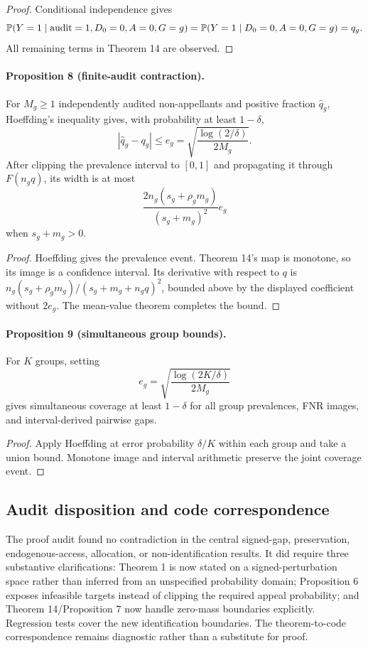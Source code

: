 \begin{proof}
Conditional independence gives
\[
\mathbb{P}(Y=1\mid \text{audit}=1,D_0=0,A=0,G=g)
=\mathbb{P}(Y=1\mid D_0=0,A=0,G=g)=q_g.
\]
All remaining terms in Theorem 14 are observed.
\end{proof}

\paragraph{Proposition 8 (finite-audit contraction).}
For $M_g\ge1$ independently audited non-appellants and positive fraction
$\widehat q_g$, Hoeffding's inequality gives, with probability at least
$1-\delta$,
\[
|\widehat q_g-q_g|\le
e_g=\sqrt{\frac{\log(2/\delta)}{2M_g}}.
\]
After clipping the prevalence interval to $[0,1]$ and propagating it through
$F(n_gq)$, its width is at most
\[
\frac{2n_g(s_g+\rho_gm_g)}{(s_g+m_g)^2}e_g
\]
when $s_g+m_g>0$.

\begin{proof}
Hoeffding gives the prevalence event.  Theorem 14's map is monotone, so its
image is a confidence interval.  Its derivative with respect to $q$ is
$n_g(s_g+\rho_gm_g)/(s_g+m_g+n_gq)^2$, bounded above by the displayed
coefficient without $2e_g$.  The mean-value theorem completes the bound.
\end{proof}

\paragraph{Proposition 9 (simultaneous group bounds).}
For $K$ groups, setting
\[
e_g=\sqrt{\frac{\log(2K/\delta)}{2M_g}}
\]
gives simultaneous coverage at least $1-\delta$ for all group prevalences,
FNR images, and interval-derived pairwise gaps.

\begin{proof}
Apply Hoeffding at error probability $\delta/K$ within each group and take a
union bound.  Monotone image and interval arithmetic preserve the joint
coverage event.
\end{proof}

\subsection{Audit disposition and code correspondence}

The proof audit found no contradiction in the central signed-gap,
preservation, endogenous-access, allocation, or non-identification results.
It did require three substantive clarifications: Theorem 1 is now stated on a
signed-perturbation space rather than inferred from an unspecified probability
domain; Proposition 6 exposes infeasible targets instead of clipping the
required appeal probability; and Theorem 14/Proposition 7 now handle zero-mass
boundaries explicitly.  Regression tests cover the new identification
boundaries.  The theorem-to-code correspondence remains diagnostic rather
than a substitute for proof.
